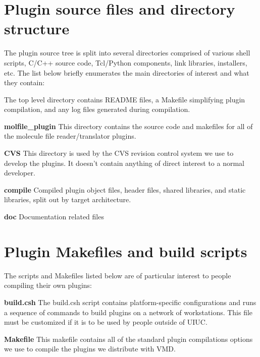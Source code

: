 \section{Plugin source files and directory structure}\label{filestruct}
 

 The plugin source tree is split into several directories comprised of various shell scripts, C/C++ source code,  Tcl/Python components, link libraries, installers, etc. The list below briefly enumerates the main directories of  interest and what they contain:

\begin{CompactItemize}
\item 
The top level directory contains README files, a Makefile simplifying  plugin compilation, and any log files generated during compilation.

\item 
{\bf molfile\_\-plugin}  This directory contains the source code and makefiles for all of the molecule file reader/translator plugins.

\item 
{\bf CVS} This directory is used by the CVS revision control system we use to develop the plugins. It doesn't contain anything of  direct interest to a normal developer.

\item 
{\bf compile}  Compiled plugin object files, header files, shared libraries, and static libraries, split out by target architecture.

\item 
{\bf doc}  Documentation related files

\end{CompactItemize}




\section{Plugin Makefiles and build scripts}\label{buildscripts}
 

 The scripts and Makefiles listed below are of particular interest to people compiling their own plugins: \begin{CompactItemize}
\item 
{\bf build.csh} The build.csh script contains platform-specific configurations and runs a sequence of commands to build plugins on a network of workstations. This file must be customized if it is to be used by people outside of UIUC.

\item 
{\bf Makefile} This makefile contains all of the standard plugin compilations options we use to compile the plugins we distribute with VMD.

\end{CompactItemize}
